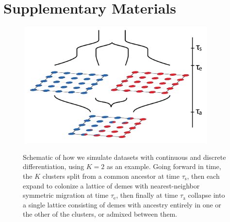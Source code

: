 \documentclass[12pt]{article}
\begin{document}
\newpage
\section*{Supplementary Materials}
\renewcommand{\theequation}{S\arabic{equation}}
\setcounter{equation}{0}
\renewcommand{\thetable}{S\arabic{table}}
\setcounter{table}{0}
\renewcommand{\thefigure}{S\arabic{figure}}
\setcounter{figure}{0}


\clearpage
\begin{figure}
	\centering
		{\includegraphics[width=4in,height=2.5in]{figs/sims/sim_setup.png}}
		\caption{Schematic of how we simulate datasets with continuous and discrete differentiation, using $K=2$ as an example.  
			    Going forward in time, the $K$ clusters split from a common ancestor at time $\tau_{\text{s}}$,
			    then each expand to colonize a lattice of demes with nearest-neighbor symmetric migration at time $\tau_{\text{e}}$,
			    then finally at time $\tau_{\text{a}}$ collapse into a single lattice consisting of demes 
			    with ancestry entirely in one or the other of the clusters,
			    or admixed between them.
			    }\label{sim_setup}
\end{figure}
\end{document}
